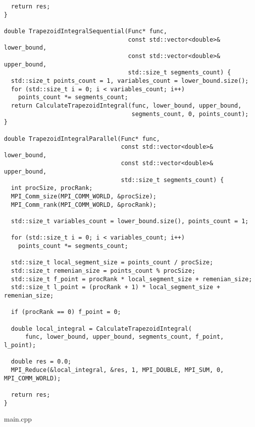 \documentclass{report}
\begin{document}
\begin{lstlisting}
  return res;
}

double TrapezoidIntegralSequential(Func* func,
                                   const std::vector<double>& lower_bound,
                                   const std::vector<double>& upper_bound,
                                   std::size_t segments_count) {
  std::size_t points_count = 1, variables_count = lower_bound.size();
  for (std::size_t i = 0; i < variables_count; i++)
    points_count *= segments_count;
  return CalculateTrapezoidIntegral(func, lower_bound, upper_bound,
                                    segments_count, 0, points_count);
}

double TrapezoidIntegralParallel(Func* func,
                                 const std::vector<double>& lower_bound,
                                 const std::vector<double>& upper_bound,
                                 std::size_t segments_count) {
  int procSize, procRank;
  MPI_Comm_size(MPI_COMM_WORLD, &procSize);
  MPI_Comm_rank(MPI_COMM_WORLD, &procRank);

  std::size_t variables_count = lower_bound.size(), points_count = 1;

  for (std::size_t i = 0; i < variables_count; i++)
    points_count *= segments_count;

  std::size_t local_segment_size = points_count / procSize;
  std::size_t remenian_size = points_count % procSize;
  std::size_t f_point = procRank * local_segment_size + remenian_size;
  std::size_t l_point = (procRank + 1) * local_segment_size + remenian_size;

  if (procRank == 0) f_point = 0;

  double local_integral = CalculateTrapezoidIntegral(
      func, lower_bound, upper_bound, segments_count, f_point, l_point);

  double res = 0.0;
  MPI_Reduce(&local_integral, &res, 1, MPI_DOUBLE, MPI_SUM, 0, MPI_COMM_WORLD);

  return res;
}
\end{lstlisting}
\par main.cpp
\end{document}
